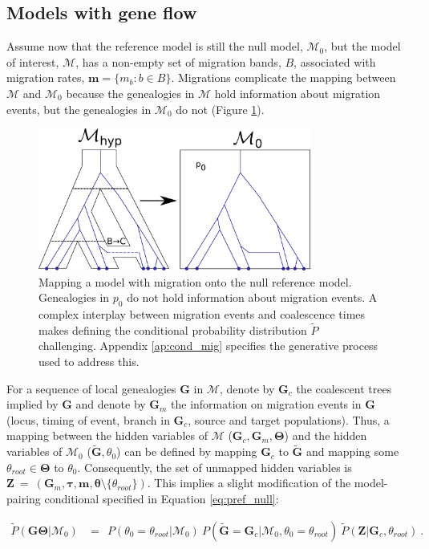 \documentclass[11pt]{article}
\newcommand{\vect}[1]{\boldsymbol{\mathbf{#1}}}
\newcommand{\M}{\mathcal{M}}
\newcommand{\G}{\vect{G}}
\newcommand{\T}{\vect{\Theta}}
\newcommand{\GT}{\G\T}
\newcommand{\Pref}{\widetilde{P}}
\newcommand{\Gref}{\widetilde{\G}}
\newcommand{\1}{\mathbbm{1}}
\newcommand{\Z}{\vect{Z}}
\newcommand{\troot}{\theta_{root}}
\newcommand{\Gc}{\G_c}
\newcommand{\Gm}{\G_m}
\newcommand{\taus}{\vect\tau}
\newcommand{\thetas}{\vect\theta}
\newcommand{\migs}{\vect{m}}
\begin{document}
\subsection{Models with gene flow}

Assume now that the reference model is still the null model, $\M_0$, but the model of interest, $\M$, has a non-empty set of migration bands, $B$, associated with migration rates, $\migs=\{m_b:b\in B\}$.
%
Migrations complicate the mapping between $\M$ and $\M_0$ because the genealogies in $\M$ hold information
about migration events, but the genealogies in $\M_0$ do not (Figure \ref{fig:null_model_with_migration}).
%


\begin{figure}[h]
\centering
\includegraphics[width=0.8\textwidth]
{null_model_with_migration}
\captionsetup{width=.8\textwidth}
\caption{Mapping a model with migration onto the null reference model. Genealogies in $p_0$ do not hold information about migration events. A complex interplay between migration events and coalescence times makes defining the conditional probability distribution $\Pref$ challenging. Appendix \ref{ap:cond_mig} specifies the generative process used to address this.}
\label{fig:null_model_with_migration}
\end{figure}




For a sequence of local genealogies $\G$ in $\M$, denote by $\Gc$ the coalescent trees implied by $\G$
and denote by $\Gm$ the information on migration events in $\G$ (locus, timing of event, branch in $\Gc$, source and target populations).
%
Thus, a mapping between the hidden variables of $\M$ ($\Gc,\Gm,\T$) and the hidden variables of $\M_0$ ($\Gref,\theta_0$) can be defined by
mapping $\Gc$ to $\Gref$ and mapping some $\troot\in\T$ to $\theta_0$.
%
Consequently, the set of unmapped hidden variables is $\Z~=~ (\Gm,\taus,\migs,\thetas\setminus\{\troot\})$.
%
This implies a slight modification of the model-pairing conditional specified in Equation \ref{eq:pref_null}:
%
%
\begin{small}
\begin{align}
 \Pref(\GT|\M_0)
 &=~~ 
 P(\theta_0=\troot|\M_0)\  P(\Gref=\Gc|\M_0,\theta_0=\troot)\ \Pref(\Z|\Gc,\troot)  ~ .\label{eq:pref_mig}
\end{align}
\end{small}
\end{document}
